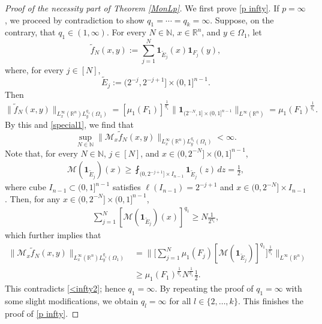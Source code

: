 \documentclass[11pt, reqno]{amsart}
\theoremstyle{definition}
\theoremstyle{remark}
\numberwithin{equation}{section}
\begin{document}
\begin{proof}[Proof of the necessity part of Theorem \ref{MonLp}]
We first prove \eqref{p infty}.
If $p=\infty$, we proceed by contradiction
to show $q_1=\cdots=q_k=\infty$.
Suppose, on the contrary, that $q_1\in(1,\infty)$.
For every $N\in\mathbb N$, $x\in\mathbb R^n$, and $y\in\Omega_1$, let
$$
\widetilde f_N(x,y):=\sum_{j=1}^N
\mathbf{1}_{\widetilde E_j}(x)
\mathbf{1}_{F_j}(y),
$$
where, for every $j\in[N]$,
$$
\widetilde E_j:=\Big(2^{-j},2^{-j+1}\Big]
\times (0,1]^{n-1}.
$$
Then
$$
\Big\|\widetilde f_N(x,y)\Big\|_{L^\infty_x(\mathbb R^n)L^{q_1}_y(\Omega_1)}
=[\mu_1(F_1)]^{\frac1{q_1}}\|\mathbf{1}_{(2^{-N},1]\times(0,1]^{n-1}}\|_{L^\infty(\mathbb R^n)}
=\mu_1(F_1)^{\frac1{q_1}}.
$$
By this and \eqref{special1}, we find that
\begin{equation}\label{<infty2}
\sup_{N\in\mathbb N} \Big\|\mathcal M_x\widetilde f_N(x,y)\Big\|_{L^\infty_x(\mathbb R^n)L^{q_1}_y(\Omega_1)}
<\infty.
\end{equation}
Note that, for every $N\in\mathbb N$,
$j\in[N]$, and $x\in(0,2^{-N}]\times (0,1]^{n-1}$,
\begin{align*}
\mathcal M(\mathbf{1}_{\widetilde E_j})(x)
\geq \fint_{(0,2^{-j+1}]\times I_{n-1}} \mathbf{1}_{\widetilde E_j}(z)\,dz
=\frac12,
\end{align*}
where cube $I_{n-1}\subset (0,1]^{n-1}$
satisfies $\ell(I_{n-1})=2^{-j+1}$
and $x\in (0,2^{-N}]\times I_{n-1}$.
Then, for any $x\in(0,2^{-N}]\times (0,1]^{n-1}$,
\begin{align*}
\sum_{j=1}^N [\mathcal M(\mathbf{1}_{\widetilde E_j})(x)]^{q_1}
\geq N \frac{1}{2^{q_1}},
\end{align*}
which further implies that
\begin{align*}
\Big\|\mathcal M_x\widetilde f_N(x,y)\Big\|_{L^\infty_x(\mathbb R^n)L^{q_1}_y(\Omega_1)}
&=\Bigg\|\Bigg[\sum_{j=1}^N\mu_1(F_j)
[\mathcal M(\mathbf{1}_{\widetilde E_j})]^{q_1}\Bigg]^{\frac1{q_1}}\Bigg\|_{L^\infty(\mathbb R^n)}\\
&\geq \mu_1(F_1)^{\frac1{q_1}} N^{\frac1{q_1}} \frac{1}{2}.
\end{align*}
This contradicts \eqref{<infty2}; hence $q_1=\infty$.
By repeating the proof of $q_1=\infty$ with
some slight modifications, we obtain $q_l=\infty$ for all $l\in\{2,\ldots,k\}$.
This finishes the proof of \eqref{p infty}.


\end{proof}
\end{document}
